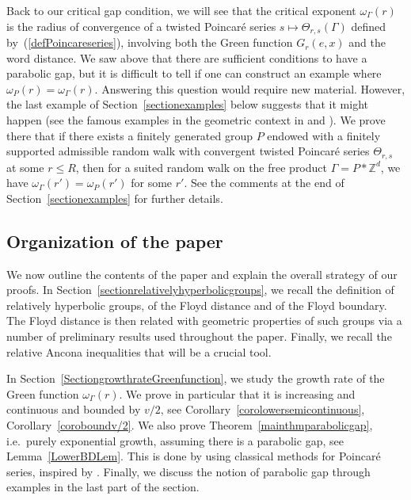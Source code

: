 \documentclass{amsart}
\theoremstyle{definition}
\theoremstyle{remark}
\begin{document}
\medskip
Back to our critical gap condition, we will see that the critical exponent $\omega_\Gamma(r)$ is the radius of convergence of a twisted Poincaré series $s\mapsto \Theta_{r,s}(\Gamma)$ defined by~(\ref{defPoincareseries}), involving both the Green function $G_r(e,x)$ and the word distance.
We saw above that there are sufficient conditions to have a parabolic gap, but it is difficult to tell if one can construct an example where $\omega_P(r)=\omega_\Gamma(r)$.
Answering this question would require new material.
However, the last example of Section~\ref{sectionexamples} below  suggests that it might happen (see the famous examples in the geometric context in \cite{DOP} and \cite{Peigne}).
We prove there that if there exists a finitely generated group $P$ endowed with a finitely supported admissible random walk with convergent twisted Poincaré series $\Theta_{r,s}$ at some $r\leq R$, then for a suited random walk on the free product $\Gamma=P*\mathbb Z^d$, we have $\omega_\Gamma(r')=\omega_P(r')$ for some $r'$.
See the comments at the end of Section~\ref{sectionexamples} for further details.

\subsection{Organization of the paper}
We now outline the contents of the paper and explain the overall strategy of our proofs.
In Section~\ref{sectionrelativelyhyperbolicgroups}, we recall the definition of relatively hyperbolic groups, of the Floyd distance and of the Floyd boundary.
The Floyd distance is then related with geometric properties of such groups via a number of preliminary results  used throughout the paper.
Finally, we recall the relative Ancona inequalities that will be a crucial tool.

In Section~\ref{SectiongrowthrateGreenfunction}, we study the growth rate of the Green function $\omega_\Gamma(r)$.
We prove in particular that it is increasing and continuous and bounded by $v/2$, see Corollary~\ref{corolowersemicontinuous}, Corollary~\ref{coroboundv/2}.
We also prove Theorem~\ref{mainthmparabolicgap}, i.e.\ purely exponential growth, assuming there is a parabolic gap, see Lemma~\ref{LowerBDLem}.
This is done by using classical methods for Poincar\'e series, inspired by \cite{YangSCC}.
Finally, we discuss the notion of parabolic gap through examples in the last part of the section.
\end{document}
